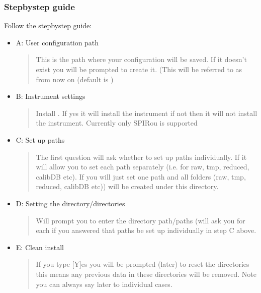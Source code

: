 \documentclass[a4paper,10pt,english]{report}
\begin{document}
\subsubsection{Step\sphinxhyphen{}by\sphinxhyphen{}step guide}
\label{\detokenize{user/general/installation:step-by-step-guide}}
Follow the step\sphinxhyphen{}by\sphinxhyphen{}step guide:
\begin{itemize}
\item {} 
A: User configuration path
\begin{quote}

This is the path where your configuration will be saved. If it doesn’t exist you will be prompted to create it. (This will be referred to as {\hyperref[\detokenize{misc/glossary:term-drs-uconfig}]{}}
from now on (default is )
\end{quote}

\item {} 
B: Instrument settings
\begin{quote}

Install {\hyperref[\detokenize{misc/glossary:term-instrument}]{}}.
If yes it will install the instrument if not then it will not install the instrument. Currently only SPIRou is supported
\end{quote}

\item {} 
C: Set up paths
\begin{quote}

The first question will ask  whether to set up paths individually. If 
it will allow you to set each path separately (i.e. for raw, tmp, reduced, calibDB etc). If 
you will just set one path and all folders (raw, tmp, reduced, calibDB etc)) will be created under this directory.
\end{quote}

\item {} 
D: Setting the directory/directories
\begin{quote}

Will prompt you to enter the directory path/paths (will ask you for each if you answered that paths be set up individually in step C above.
\end{quote}

\item {} 
E: Clean install
\begin{quote}

If you type {[}Y{]}es you will be prompted (later) to reset the directories this means any previous data in these directories will be removed. Note you can always say later to individual cases.
\end{quote}

\end{itemize}
\end{document}
